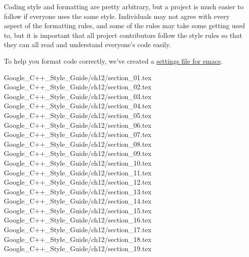 Coding style and formatting are pretty arbitrary, but a project is much easier to follow if everyone uses the same style. Individuals may not agree with every aspect of the formatting rules, and some of the rules may take some getting used to, but it is important that all project contributors follow the style rules so that they can all read and understand everyone's code easily.

To help you format code correctly, we've created a \href{https://raw.githubusercontent.com/google/styleguide/gh-pages/google-c-style.el}{settings file for emacs}.

{Google_C++_Style_Guide/ch12/section_01.tex}
{Google_C++_Style_Guide/ch12/section_02.tex}
{Google_C++_Style_Guide/ch12/section_03.tex}
{Google_C++_Style_Guide/ch12/section_04.tex}
{Google_C++_Style_Guide/ch12/section_05.tex}
{Google_C++_Style_Guide/ch12/section_06.tex}
{Google_C++_Style_Guide/ch12/section_07.tex}
{Google_C++_Style_Guide/ch12/section_08.tex}
{Google_C++_Style_Guide/ch12/section_09.tex}
{Google_C++_Style_Guide/ch12/section_10.tex}
{Google_C++_Style_Guide/ch12/section_11.tex}
{Google_C++_Style_Guide/ch12/section_12.tex}
{Google_C++_Style_Guide/ch12/section_13.tex}
{Google_C++_Style_Guide/ch12/section_14.tex}
{Google_C++_Style_Guide/ch12/section_15.tex}
{Google_C++_Style_Guide/ch12/section_16.tex}
{Google_C++_Style_Guide/ch12/section_17.tex}
{Google_C++_Style_Guide/ch12/section_18.tex}
{Google_C++_Style_Guide/ch12/section_19.tex}